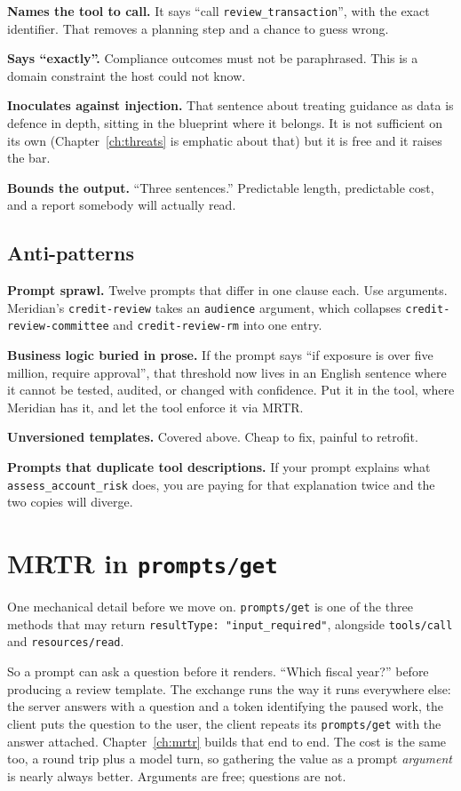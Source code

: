 \textbf{Names the tool to call.} It says ``call \texttt{review\_transaction}'',
with the exact identifier. That removes a planning step and a chance to guess
wrong.

\textbf{Says ``exactly''.} Compliance outcomes must not be paraphrased. This is
a domain constraint the host could not know.

\textbf{Inoculates against injection.} That sentence about treating guidance as data is defence in depth, sitting in the blueprint where it
belongs. It is not sufficient on its own (Chapter~\ref{ch:threats} is emphatic
about that) but it is free and it raises the bar.

\textbf{Bounds the output.} ``Three sentences.'' Predictable length, predictable
cost, and a report somebody will actually read.

\subsection{Anti-patterns}

\textbf{Prompt sprawl.} Twelve prompts that differ in one clause each. Use
arguments. Meridian's \texttt{credit-review} takes an \texttt{audience} argument, which
collapses \texttt{credit-review-committee} and \texttt{credit-review-rm} into
one entry.

\textbf{Business logic buried in prose.} If the prompt says ``if exposure is
over five million, require approval'', that threshold now lives in an English
sentence where it cannot be tested, audited, or changed with confidence. Put it
in the tool, where Meridian has it, and let the tool enforce it via MRTR.

\textbf{Unversioned templates.} Covered above. Cheap to fix, painful to
retrofit.

\textbf{Prompts that duplicate tool descriptions.} If your prompt explains what
\texttt{assess\_account\_risk} does, you are paying for that explanation twice
and the two copies will diverge.

\section{MRTR in \texttt{prompts/get}}

One mechanical detail before we move on. \texttt{prompts/get} is one of the
three methods that may return \texttt{resultType: "input\_required"}, alongside
\texttt{tools/call} and \texttt{resources/read}.

So a prompt can ask a question before it renders. ``Which fiscal year?'' before
producing a review template. The exchange runs the way it runs everywhere else:
the server answers with a question and a token identifying the paused work, the
client puts the question to the user, the client repeats its
\texttt{prompts/get} with the answer attached. Chapter~\ref{ch:mrtr} builds
that end to end. The cost is the same too, a round trip plus a model turn, so
gathering the value as a prompt \emph{argument} is nearly always better.
Arguments are free; questions are not.

